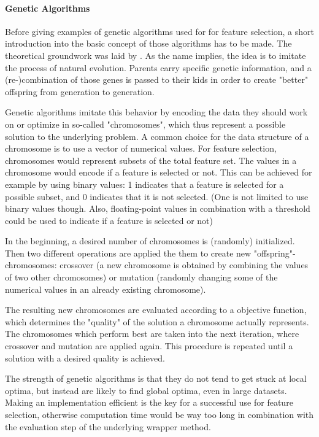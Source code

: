 \paragraph{Genetic Algorithms}
\label{par:methods.flat.wrapper.genetic}


Before giving examples of genetic algorithms used for for feature selection, a short introduction into the basic concept of those algorithms has to be made. 
The theoretical groundwork was laid by \cite{Holland:92}. As the name implies, the idea is to imitate the process of natural evolution. Parents carry specific
genetic information, and a (re-)combination of those genes is passed to their kids in order to create "better" offspring from generation to generation. 

Genetic algorithms imitate this behavior by encoding the data they should work on or optimize in so-called "chromosomes", which thus represent
a possible solution to the underlying problem. A common choice for the data structure of a chromosome is to use a vector of numerical values.
For feature selection, chromosomes would represent subsets of the total feature set. The values in a chromosome would encode if a feature is selected or not. 
This can be achieved for example by using binary values: 1 indicates that a feature is selected for a possible subset, and 0 indicates that it is not selected. 
(One is not limited to use binary values though. Also, floating-point values in combination with a threshold could be used to indicate if a feature is selected or not)

In the beginning, a desired number of chromosomes is (randomly) initialized. Then two different operations are applied the them to create 
new "offspring"-chromosomes: crossover (a new chromosome is obtained by combining the values of two other chromosomes) 
or mutation (randomly changing some of the numerical values in an already existing chromosome). 

The resulting new chromosomes are evaluated according to a objective function, which determines the "quality" of the solution a chromosome actually represents. 
The chromosomes which perform best are taken into the next iteration, where crossover and mutation are applied again.
This procedure is repeated until a solution with a desired quality is achieved.

The strength of genetic algorithms is that they do not tend to get stuck at local optima, but instead are likely to find global optima, even in large datasets.
Making an implementation efficient is the key for a successful use for feature selection, otherwise computation time would be way too long in combination
with the evaluation step of the underlying wrapper method. 

